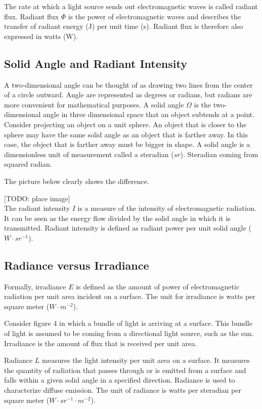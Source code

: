 \documentclass[11pt,a4paper]{report}
\begin{document}
The rate at which a light source sends out electromagnetic waves is called radiant flux. Radiant flux $\Phi$ is the power of electromagnetic waves and describes the transfer of radiant energy (J) per unit time (s). Radiant flux is therefore also expressed in watts (W).

\subsection{Solid Angle and Radiant Intensity}

A two-dimensional angle can be thought of as drawing two lines from the center of a circle outward. Angle are represented as degrees or radians, but radians are more convenient for mathematical purposes. A solid angle $\Omega$ is the two-dimensional angle in three dimensional space that an object subtends at a point. Consider projecting an object on a unit sphere. An object that is closer to the sphere may have the same solid angle as an object that is farther away. In this case, the object that is farther away must be bigger in shape. A solid angle is a dimensionless unit of measurement called a steradian ($sr$). Steradian coming from squared radian.

The picture below clearly shows the difference.

[TODO: place image]\\

The radiant intensity $I$ is a measure of the intensity of electromagnetic radiation. It can be seen as the energy flow divided by the solid angle in which it is transmitted. Radiant intensity is defined as radiant power per unit solid angle ($W \cdot sr^{-1}$).

\subsection{Radiance versus Irradiance}

Formally, irradiance $E$ is defined as the amount of power of electromagnetic radiation per unit area incident on a surface. The unit for irradiance is watts per square meter ($W \cdot m^{-2}$). 

Consider figure 4 in which a bundle of light is arriving at a surface. This bundle of light is assumed to be coming from a directional light source, such as the sun. Irradiance is the amount of flux that is received per unit area.

Radiance $L$ measures the light intensity per unit area on a surface. It measures the quantity of radiation that passes through or is emitted from a surface and falls within a given solid angle in a specified direction. Radiance is used to characterize diffuse emission. The unit of radiance is watts per steradian per square meter ($W \cdot {sr}^{-1} \cdot m^{-2}$).
\end{document}
